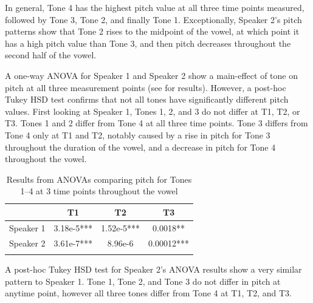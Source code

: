 \documentclass[output=paper]{langscibook}
\begin{document}
In general, Tone 4 has the highest pitch value at all three time points measured, followed by Tone 3, Tone 2, and finally Tone 1. Exceptionally, Speaker 2's pitch patterns show that Tone 2 rises to the midpoint of the vowel, at which point it has a high pitch value than Tone 3, and then pitch decreases throughout the second half of the vowel.\largerpage

A one-way ANOVA for Speaker 1 and Speaker 2 show a main-effect of tone on pitch at all three measurement points (see  for results). However, a post-hoc Tukey HSD test confirms that not all tones have significantly different pitch values. First looking at Speaker 1, Tones 1, 2, and 3 do not differ at T1, T2, or T3. Tones 1 and 2 differ from Tone 4 at all three time points. Tone 3 differs from Tone 4 only at T1 and T2, notably caused by a rise in pitch for Tone 3 throughout the duration of the vowel, and a decrease in pitch for Tone 4 throughout the vowel.

\begin{table}
\caption{Results from ANOVAs comparing pitch for Tones 1--4 at 3 time points throughout the vowel}
\label{tab:oakley:GueToneAnova}
\begin{tabular}{l *{2}{S[table-align-text-post=false,table-format=1.2e-1{***}]} S[table-align-text-post=false,table-format=1.5{***}]}
 \lsptoprule
 & {T1} & {T2} & {T3} \\
 \midrule
Speaker 1 & 3.18e-5*** & 1.52e-5*** & 0.0018**  \\ 
Speaker 2 & 3.61e-7*** & 8.96e-6 & 0.00012***  \\ 
\lspbottomrule
\end{tabular}
\end{table}

A post-hoc Tukey HSD test for Speaker 2's ANOVA results show a very similar pattern to Speaker 1. Tone 1, Tone 2, and Tone 3 do not differ in pitch at anytime point, however all three tones differ from Tone 4 at T1, T2, and T3. 
\end{document}
